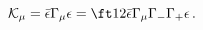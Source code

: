 \begin{equation}
  \mathcal{K}_\mu =\bar \epsilon \Gamma_\mu \epsilon=\ft12\bar \epsilon \Gamma_\mu \Gamma _-\Gamma
  _+\epsilon\,.
 \label{Kmu}
\end{equation}

